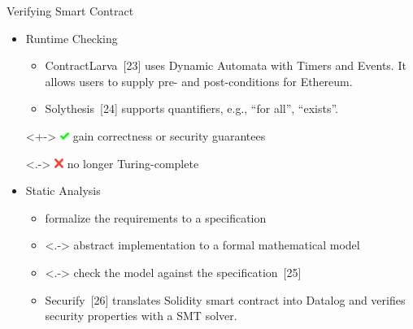 \documentclass[xcolor=svgnames]{beamer}
\begin{document}
\begin{frame}{Verifying Smart Contract}
\onslide<+->
\begin{itemize}
\item Runtime Checking
\begin{itemize}
\item<+-> ContractLarva~[23] uses Dynamic Automata with Timers and Events. It allows users to supply pre- and post-conditions for Ethereum.
\item<+-> Solythesis~[24] supports quantifiers, e.g., ``for all'', ``exists''. 
\end{itemize}
\item[]<+-> \includegraphics[width=0.8em]{check.png}  gain correctness or security guarantees
\item[]<.-> \includegraphics[width=0.8em]{cross.png} no longer Turing-complete


\item Static Analysis 
\begin{itemize}

\item<+-> formalize the requirements to a specification
\item<.-> abstract implementation to a formal mathematical model
\item<.-> check the model against the specification~[25]
\item<+-> Securify~[26] translates Solidity smart contract into Datalog and verifies security properties with a SMT solver.

\end{itemize}

\end{itemize}

\end{frame}
\end{document}
